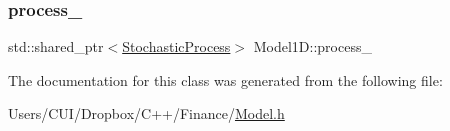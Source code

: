 \subsubsection{\texorpdfstring{process\+\_\+}{process\_}}
{\footnotesize\ttfamily std\+::shared\+\_\+ptr$<$\hyperlink{class_stochastic_process}{Stochastic\+Process}$>$ Model1\+D\+::process\+\_\+\hspace{0.3cm}{\ttfamily [protected]}}



The documentation for this class was generated from the following file\+:\begin{DoxyCompactItemize}
\item 
Users/\+C\+U\+I/\+Dropbox/\+C++/\+Finance/\hyperlink{_model_8h}{Model.\+h}\end{DoxyCompactItemize}
